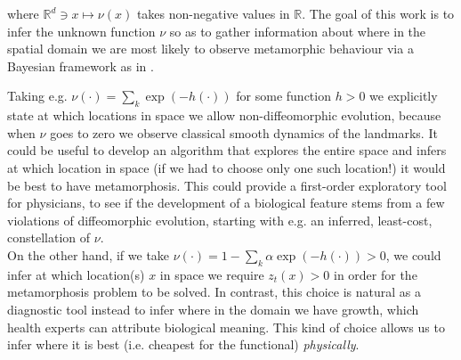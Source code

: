 \documentclass[runningheads]{llncs}
\newcommand{\Rd}{\mathbb{R}^{d}}
\begin{document}
where $\Rd\ni x\mapsto\nu (x)$ takes non-negative values in $\mathbb R$. The
goal of this work is to infer the unknown function $\nu$ so as to gather
information about where in the spatial domain we are most likely to observe
metamorphic behaviour via a Bayesian framework as in \cite{dashti2017bayesian}.

\begin{remark}\label{remark:nu}
Taking e.g. $\nu(\cdot) = \sum_k \exp(-h(\cdot))$ for some function $h>0$ we
explicitly state at which locations in space we allow non-diffeomorphic
evolution, because when $\nu$ goes to zero we observe classical smooth dynamics
of the landmarks.  It could be useful to develop an algorithm that explores the
entire space and infers at which location in space (if we had to choose only one
such location!) it would be best to have metamorphosis. This could provide a
first-order exploratory tool for physicians, to see if the development of a
biological feature stems from a few violations of diffeomorphic evolution,
starting with e.g. an inferred, least-cost, constellation of $\nu$.\\

On the other hand, if we take $\nu(\cdot) = 1 - \sum_k \alpha
\exp(-h(\cdot))>0$, we could infer at which location(s) $x$ in space we require
$z_t(x)>0$ in order for the metamorphosis problem to be solved. In contrast,
this choice is natural as a diagnostic tool instead to infer where in the domain
we have growth, which health experts can attribute biological meaning. This kind
of choice allows us to infer where it is best (i.e. cheapest for the functional)
\emph{physically}.
\end{remark}
\end{document}
